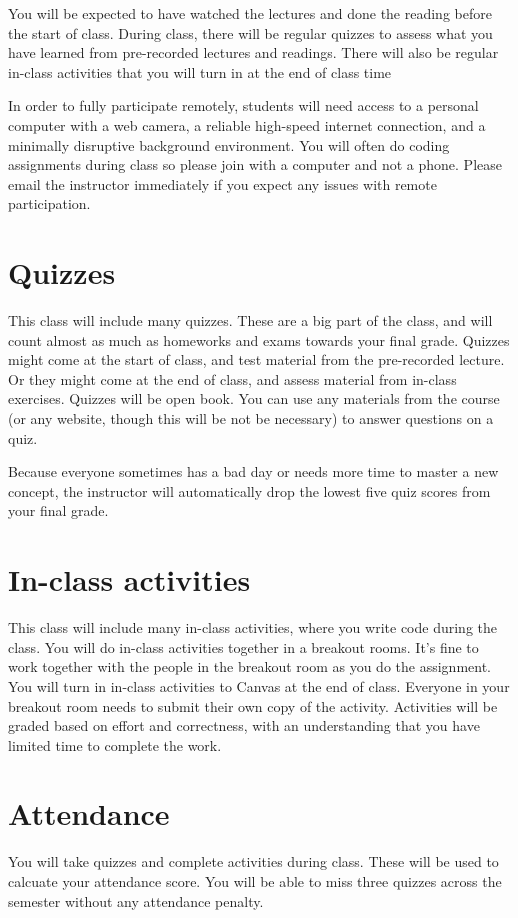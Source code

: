 \documentclass[10pt]{memoir}
\begin{document}
{You will be expected to have watched the lectures and done the reading before the start of class}. During class, there will be regular quizzes to assess what you have learned from pre-recorded lectures and readings. There will also be regular in-class activities that you will turn in at the end of class time
 
In order to fully participate remotely, students will need access to a personal computer with a web camera, a reliable high-speed internet connection, and a minimally disruptive background environment. {You will often do coding assignments during class so please join with a computer and not a phone}. Please email the instructor immediately if you expect any issues with remote participation.

\section{\textbf{Quizzes}}

This class will include many quizzes. These are a big part of the class, and will count almost as much as homeworks and exams towards your final grade. Quizzes might come at the start of class, and test material from the pre-recorded lecture. Or they might come at the end of class, and assess material from in-class exercises. Quizzes will be open book. You can use any materials from the course (or any website, though this will be not be necessary) to answer questions on a quiz. 

Because everyone sometimes has a bad day or needs more time to master a new concept, the instructor will automatically drop the lowest five quiz scores from your final grade. 

\section{\textbf{In-class activities}}
This class will include many in-class activities, where you write code during the class. You will do in-class activities together in a breakout rooms. It's fine to work together with the people in the breakout room as you do the assignment. You will turn in in-class activities to Canvas at the end of class. Everyone in your breakout room needs to submit their own copy of the activity. Activities will be graded based on effort and correctness, with an understanding that you have limited time to complete the work. 

\section{\textbf{Attendance}}
You will take quizzes and complete activities during class. These will be used to calcuate your attendance score. You will be able to miss three quizzes across the semester without any attendance penalty. 
\end{document}
